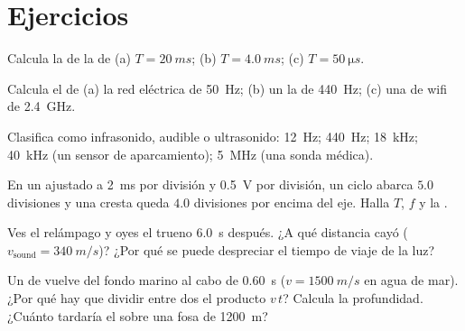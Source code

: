 \section{Ejercicios}

\begin{exercise}[$\star$]\label{exo:g10:signals-and-waves:1}
Calcula la  de la  de 
(a) $T = \qty{20}{ms}$; (b) $T = \qty{4.0}{ms}$;
(c) $T = \qty{50}{\micro s}$.
\end{exercise}

\begin{exercise}[$\star$]\label{exo:g10:signals-and-waves:2}
Calcula el  de (a) la red eléctrica de \qty{50}{Hz}; (b) un la de
\qty{440}{Hz}; (c) una  de wifi de \qty{2.4}{GHz}.
\end{exercise}

\begin{exercise}[$\star$]\label{exo:g10:signals-and-waves:3}
Clasifica como infrasonido,  audible o ultrasonido:
\qty{12}{Hz}; \qty{440}{Hz}; \qty{18}{kHz}; \qty{40}{kHz} (un sensor de
aparcamiento); \qty{5}{MHz} (una sonda médica).
\end{exercise}

\begin{exercise}[$\star$]\label{exo:g10:signals-and-waves:4}
En un  ajustado a \qty{2}{ms} por división y \qty{0.5}{V}
por división, un ciclo abarca $5.0$ divisiones y una cresta queda $4.0$
divisiones por encima del eje. Halla $T$, $f$ y la .
\end{exercise}

\begin{exercise}[$\star$]\label{exo:g10:signals-and-waves:5}
Ves el relámpago y oyes el trueno \qty{6.0}{s} después. ¿A qué distancia
cayó ($v_{\text{sound}} = \qty{340}{m/s}$)? ¿Por qué se puede despreciar
el tiempo de viaje de la luz?
\end{exercise}

\begin{exercise}[$\star\star$]\label{exo:g10:signals-and-waves:6}
Un  de  vuelve del fondo marino al cabo de \qty{0.60}{s}
($v = \qty{1500}{m/s}$ en agua de mar). ¿Por qué hay que dividir entre
dos el producto $v\,t$? Calcula la profundidad. ¿Cuánto tardaría el 
sobre una fosa de \qty{1200}{m}?
\end{exercise}

